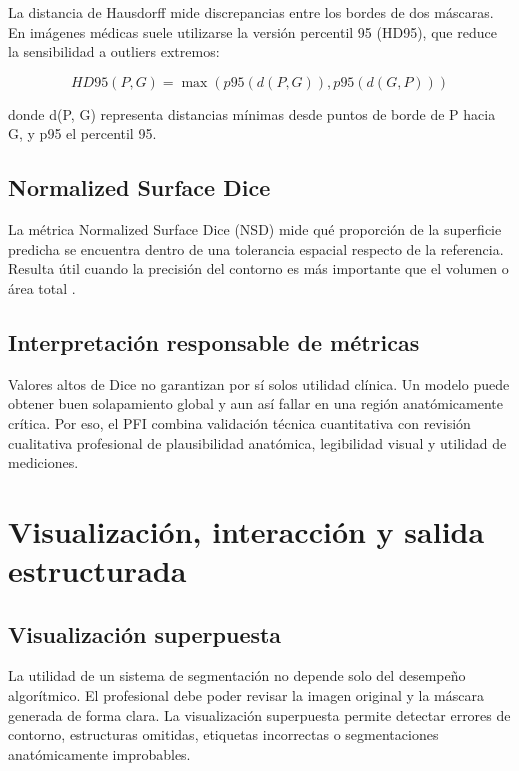La distancia de Hausdorff mide discrepancias entre los bordes de dos máscaras. En imágenes médicas suele utilizarse la versión percentil 95 (HD95), que reduce la sensibilidad a outliers extremos:

\begin{equation*}
HD95(P, G) = \max( p95(d(P, G)), p95(d(G, P)) ) \tag{8.3}
\end{equation*}

donde d(P, G) representa distancias mínimas desde puntos de borde de P hacia G, y p95 el percentil 95.

\subsection{Normalized Surface Dice}

La métrica Normalized Surface Dice (NSD) mide qué proporción de la superficie predicha se encuentra dentro de una tolerancia espacial respecto de la referencia. Resulta útil cuando la precisión del contorno es más importante que el volumen o área total \parencite{maierhein_metrics_reloaded_2024}.

\subsection{Interpretación responsable de métricas}

Valores altos de Dice no garantizan por sí solos utilidad clínica. Un modelo puede obtener buen solapamiento global y aun así fallar en una región anatómicamente crítica. Por eso, el PFI combina validación técnica cuantitativa con revisión cualitativa profesional de plausibilidad anatómica, legibilidad visual y utilidad de mediciones.

\section{Visualización, interacción y salida estructurada}

\subsection{Visualización superpuesta}

La utilidad de un sistema de segmentación no depende solo del desempeño algorítmico. El profesional debe poder revisar la imagen original y la máscara generada de forma clara. La visualización superpuesta permite detectar errores de contorno, estructuras omitidas, etiquetas incorrectas o segmentaciones anatómicamente improbables.

